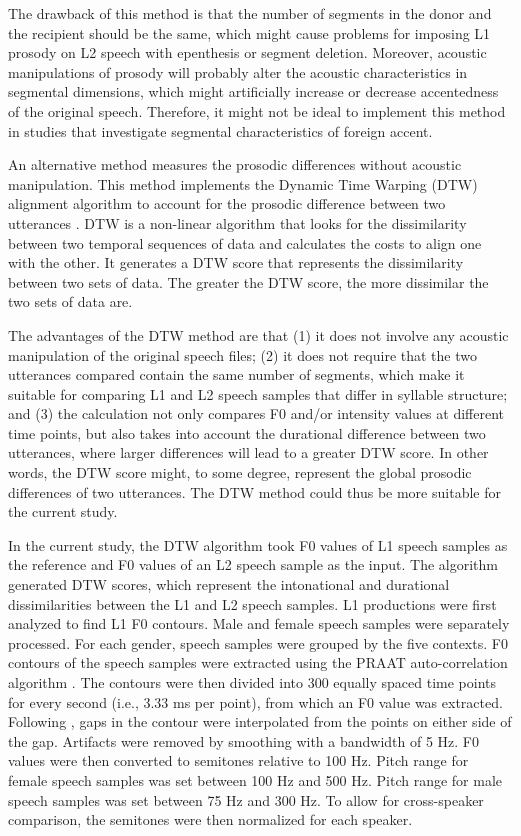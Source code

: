 The drawback of this method is that the number of segments in the donor and the recipient should be the same, which might cause problems for imposing L1 prosody on L2 speech with epenthesis or segment deletion. Moreover, acoustic manipulations of prosody will probably alter the acoustic characteristics in segmental dimensions, which might artificially increase or decrease accentedness of the original speech. Therefore, it might not be ideal to implement this method in studies that investigate segmental characteristics of foreign accent. 

An alternative method measures the prosodic differences without acoustic manipulation. This method implements the Dynamic Time Warping (DTW) alignment algorithm to account for the prosodic difference between two utterances \citep{Adami_2003, Rilliard_2011, Sharpe_2015}. DTW is a non-linear algorithm that looks for the dissimilarity between two temporal sequences of data and calculates the costs to align one with the other.  It generates a DTW score that represents the dissimilarity between two sets of data. The greater the DTW score, the more dissimilar the two sets of data are. 

The advantages of the DTW method are that (1) it does not involve any acoustic manipulation of the original speech files; (2) it does not require that the two utterances compared contain the same number of segments, which make it suitable for comparing L1 and L2 speech samples that differ in syllable structure; and (3) the calculation not only compares F0 and/or intensity values at different time points, but also takes into account the durational difference between two utterances, where larger differences will lead to a greater DTW score. In other words, the DTW score might, to some degree, represent the global prosodic differences of two utterances. The DTW method could thus be more suitable for the current study. 

In the current study, the DTW algorithm took F0 values of L1 speech samples as the reference and F0 values of an L2 speech sample as the input. The algorithm generated DTW scores, which represent the intonational and durational dissimilarities between the L1 and L2 speech samples.  L1 productions were first analyzed to find L1 F0 contours. Male and female speech samples were separately processed. For each gender, speech samples were grouped by the five contexts. F0 contours of the speech samples were extracted using the PRAAT auto-correlation algorithm \citep{Boersma_2015}. The contours were then divided into 300 equally spaced time points for every second (i.e., 3.33 ms per point), from which an F0 value was extracted. Following \citet{Morrill_2015}, gaps in the contour were interpolated from the points on either side of the gap. Artifacts were removed by smoothing with a bandwidth of 5 Hz. F0 values were then converted to semitones relative to 100 Hz. Pitch range for female speech samples was set between 100 Hz and 500 Hz. Pitch range for male speech samples was set between 75 Hz and 300 Hz. To allow for cross-speaker comparison, the semitones were then normalized for each speaker. 

